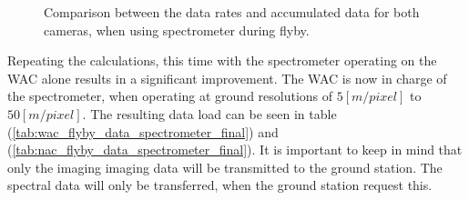 \begin{figure}[htb!]
    \centering
    \captionsetup[subfigure]{width=0.45\textwidth}
    \caption{Comparison between the data rates and accumulated data for both cameras, when using spectrometer during flyby.}\label{fig:data_gen_wac_nac_compare2}
\end{figure}
Repeating the calculations, this time with the spectrometer operating on the WAC alone results in a significant improvement. The WAC is now in charge of the spectrometer, when operating at ground resolutions of $5[m/pixel]$ to $50[m/pixel]$. The resulting data load can be seen in table (\ref{tab:wac_flyby_data_spectrometer_final}) and (\ref{tab:nac_flyby_data_spectrometer_final}). It is important to keep in mind that only the imaging imaging data will be transmitted to the ground station. The spectral data will only be transferred, when the ground station request this.
